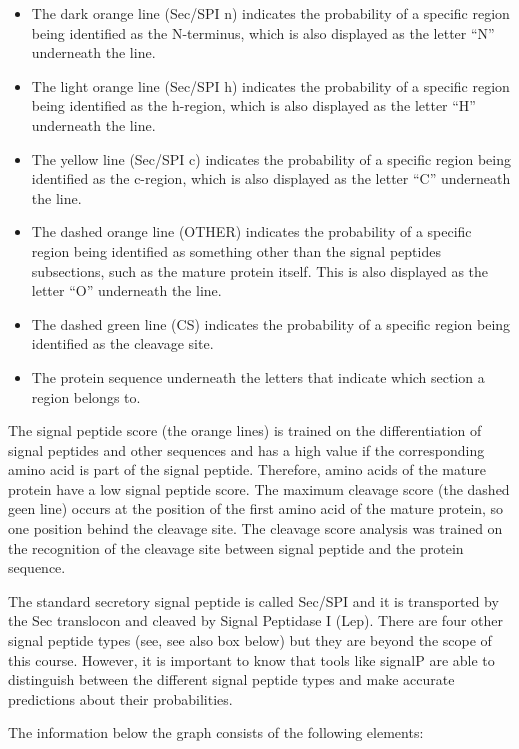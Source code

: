 \begin{itemize}
\item The dark orange line (Sec/SPI n) indicates the probability of a specific region being identified as the N-terminus, which is also displayed as the letter ``N'' underneath the line.
\item The light orange line (Sec/SPI h) indicates the probability of a specific region being identified as the h-region, which is also displayed as the letter ``H'' underneath the line.
\item The yellow line (Sec/SPI c) indicates the probability of a specific region being identified as the c-region, which is also displayed as the letter ``C'' underneath the line.
\item The dashed orange line (OTHER) indicates the probability of a specific region being identified as something other than the signal peptides subsections, such as the mature protein itself.
This is also displayed as the letter ``O'' underneath the line.
\item The dashed green line (CS) indicates the probability of a specific region being identified as the cleavage site.
\item The protein sequence underneath the letters that indicate which section a region belongs to.
\end{itemize}

The signal peptide score (the orange lines) is trained on the differentiation of signal peptides and other sequences and has a high value if the corresponding amino acid is part of the signal peptide.
Therefore, amino acids of the mature protein have a low signal peptide score.
The maximum cleavage score (the dashed geen line) occurs at the position of the first amino acid of the mature protein, so one position behind the cleavage site.
The cleavage score analysis was trained on the recognition of the cleavage site between signal peptide and the protein sequence.

The standard secretory signal peptide is called Sec/SPI and it is transported by the Sec translocon and cleaved by Signal Peptidase I (Lep).
There are four other signal peptide types (see, see also box below) but they are beyond the scope of this course.
However, it is important to know that tools like signalP are able to distinguish between the different signal peptide types and make accurate predictions about their probabilities.

The information below the graph consists of the following elements:


